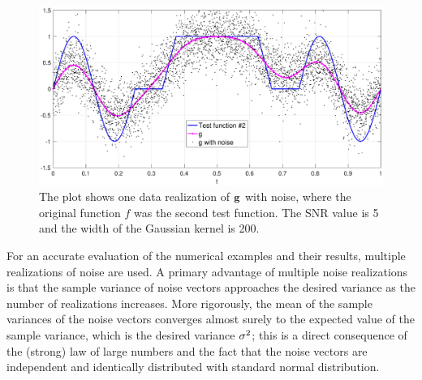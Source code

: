 \begin{figure}
	\centerline{\includegraphics[scale = 0.45]{Figures/NoisePlot1D_F2_S05_W200.eps}}
\caption{The plot shows one data realization of $\mathbf{g}$ with noise, where the original function $f$ was the second test function. The SNR value is 5 and the width of the Gaussian kernel is 200.}
\label{NoisePlot1D_F2_S05_W200}
\end{figure}

For an accurate evaluation of the numerical examples and their results, multiple realizations of noise are used. A primary advantage of multiple noise realizations is that the sample variance of noise vectors approaches the desired variance as the number of realizations increases. More rigorously, the mean of the sample variances of the noise vectors converges almost surely to the expected value of the sample variance, which is the desired variance $\sigma^2$; this is a direct consequence of the (strong) law of large numbers and the fact that the noise vectors are independent and identically distributed with standard normal distribution.
